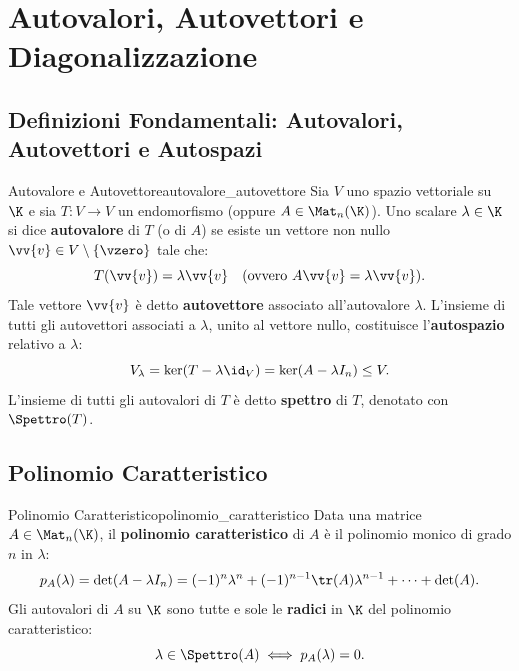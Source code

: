 
\chapter{Autovalori, Autovettori e Diagonalizzazione}
\label{chap:autovalori_autovettori}

\section{Definizioni Fondamentali: Autovalori, Autovettori e Autospazi}

\begin{definizione}{Autovalore e Autovettore}{autovalore_autovettore}
Sia $V$ uno spazio vettoriale su $\K$ e sia $T: V \to V$ un endomorfismo (oppure $A \in \Mat_n(\K)$).
Uno scalare $\lambda \in \K$ si dice \textbf{autovalore} di $T$ (o di $A$) se esiste un vettore non nullo $\vv{v} \in V \setminus \{\vzero\}$ tale che:
\begin{equation}
    T(\vv{v}) = \lambda \vv{v} \quad (\text{ovvero } A \vv{v} = \lambda \vv{v}).
\end{equation}
Tale vettore $\vv{v}$ è detto \textbf{autovettore} associato all'autovalore $\lambda$.
L'insieme di tutti gli autovettori associati a $\lambda$, unito al vettore nullo, costituisce l'\textbf{autospazio} relativo a $\lambda$:
\begin{equation}
    V_\lambda = \ker(T - \lambda \id_V) = \ker(A - \lambda I_n) \le V.
\end{equation}
L'insieme di tutti gli autovalori di $T$ è detto \textbf{spettro} di $T$, denotato con $\Spettro(T)$.
\end{definizione}

\section{Polinomio Caratteristico}

\begin{definizione}{Polinomio Caratteristico}{polinomio_caratteristico}
Data una matrice $A \in \Mat_n(\K)$, il \textbf{polinomio caratteristico} di $A$ è il polinomio monico di grado $n$ in $\lambda$:
\begin{equation}
    p_A(\lambda) = \det(A - \lambda I_n) = (-1)^n \lambda^n + (-1)^{n-1} \tr(A) \lambda^{n-1} + \dots + \det(A).
\end{equation}
Gli autovalori di $A$ su $\K$ sono tutte e sole le \textbf{radici} in $\K$ del polinomio caratteristico:
\begin{equation}
    \lambda \in \Spettro(A) \iff p_A(\lambda) = 0.
\end{equation}
\end{definizione}

